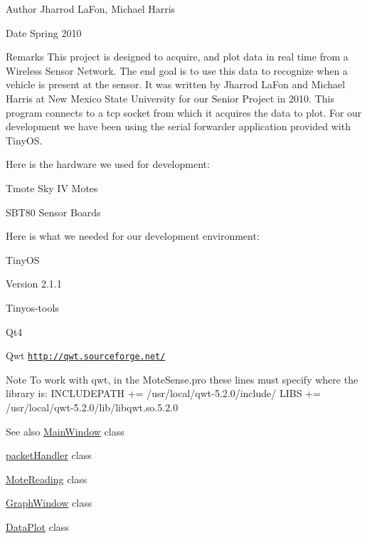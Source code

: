 \begin{DoxyAuthor}{Author}
Jharrod LaFon, Michael Harris 
\end{DoxyAuthor}
\begin{DoxyDate}{Date}
Spring 2010 
\end{DoxyDate}
\begin{DoxyRemark}{Remarks}
This project is designed to acquire, and plot data in real time from a Wireless Sensor Network. The end goal is to use this data to recognize when a vehicle is present at the sensor. It was written by Jharrod LaFon and Michael Harris at New Mexico State University for our Senior Project in 2010. This program connects to a tcp socket from which it acquires the data to plot. For our development we have been using the serial forwarder application provided with TinyOS. 
\end{DoxyRemark}


Here is the hardware we used for development:
\begin{DoxyItemize}
\item Tmote Sky IV Motes
\item SBT80 Sensor Boards
\end{DoxyItemize}

Here is what we needed for our development environment:
\begin{DoxyItemize}
\item TinyOS
\begin{DoxyEnumerate}
\item Version 2.1.1
\end{DoxyEnumerate}
\item Tinyos-\/tools
\item Qt4
\item Qwt \href{http://qwt.sourceforge.net/}{\tt http://qwt.sourceforge.net/}
\end{DoxyItemize}

\begin{DoxyNote}{Note}
To work with qwt, in the MoteSense.pro these lines must specify where the library is: INCLUDEPATH += /usr/local/qwt-\/5.2.0/include/ LIBS += /usr/local/qwt-\/5.2.0/lib/libqwt.so.5.2.0 
\end{DoxyNote}
\begin{DoxySeeAlso}{See also}
\hyperlink{classMainWindow}{MainWindow} class 

\hyperlink{classpacketHandler}{packetHandler} class 

\hyperlink{classMoteReading}{MoteReading} class 

\hyperlink{classGraphWindow}{GraphWindow} class 

\hyperlink{classDataPlot}{DataPlot} class 
\end{DoxySeeAlso}
